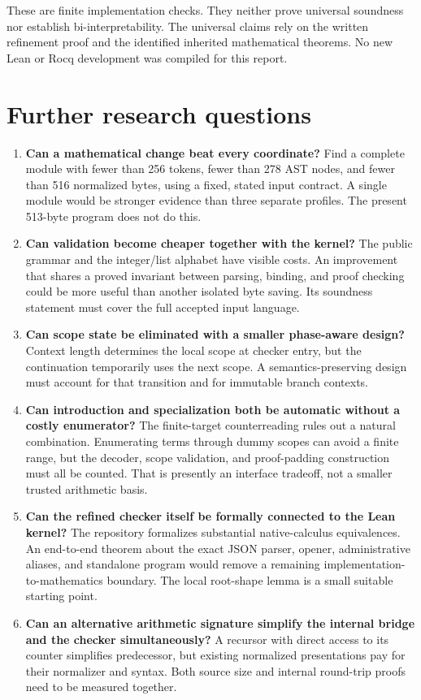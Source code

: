\documentclass[11pt,letterpaper]{article}
\theoremstyle{definition}
\begin{document}
These are finite implementation checks. They neither prove universal
soundness nor establish bi-interpretability. The universal claims rely on
the written refinement proof and the identified inherited mathematical
theorems. No new Lean or Rocq development was compiled for this report.

\section{Further research questions}
\begin{enumerate}
\item \textbf{Can a mathematical change beat every coordinate?}
Find a complete module with fewer than 256 tokens, fewer than 278 AST nodes,
and fewer than 516 normalized bytes, using a fixed, stated input contract.
A single module would be stronger evidence than three separate profiles.
The present 513-byte program does not do this.
\item \textbf{Can validation become cheaper together with the kernel?}
The public grammar and the integer/list alphabet have visible costs.
An improvement that shares a proved invariant between parsing, binding,
and proof checking could be more useful than another isolated byte saving.
Its soundness statement must cover the full accepted input language.
\item \textbf{Can scope state be eliminated with a smaller phase-aware design?}
Context length determines the local scope at checker entry, but the
continuation temporarily uses the next scope. A semantics-preserving design
must account for that transition and for immutable branch contexts.
\item \textbf{Can introduction and specialization both be automatic without
a costly enumerator?} The finite-target counterreading rules out a natural
combination. Enumerating terms through dummy scopes can avoid a finite
range, but the decoder, scope validation, and proof-padding construction
must all be counted. That is presently an interface tradeoff, not a
smaller trusted arithmetic basis.
\item \textbf{Can the refined checker itself be formally connected to the
Lean kernel?} The repository formalizes substantial native-calculus
equivalences. An end-to-end theorem about the exact JSON parser, opener,
administrative aliases, and standalone program would remove a remaining
implementation-to-mathematics boundary. The local root-shape lemma is a
small suitable starting point.
\item \textbf{Can an alternative arithmetic signature simplify the internal
bridge and the checker simultaneously?} A recursor with direct access to
its counter simplifies predecessor, but existing normalized presentations
pay for their normalizer and syntax. Both source size and internal
round-trip proofs need to be measured together.
\end{enumerate}
\end{document}
